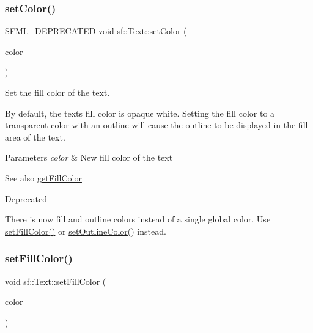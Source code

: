 \subsubsection{\texorpdfstring{setColor()}{setColor()}}
{\footnotesize\ttfamily S\+F\+M\+L\+\_\+\+D\+E\+P\+R\+E\+C\+A\+T\+ED void sf\+::\+Text\+::set\+Color (\begin{DoxyParamCaption}\item[{const \mbox{\hyperlink{classsf_1_1_color}{Color}} \&}]{color }\end{DoxyParamCaption})}



Set the fill color of the text. 

By default, the text\textquotesingle{}s fill color is opaque white. Setting the fill color to a transparent color with an outline will cause the outline to be displayed in the fill area of the text.


\begin{DoxyParams}{Parameters}
{\em color} & New fill color of the text\\
\hline
\end{DoxyParams}
\begin{DoxySeeAlso}{See also}
\mbox{\hyperlink{classsf_1_1_text_a6b4ba8c435b59e1e05f831e6230dc537}{get\+Fill\+Color}}
\end{DoxySeeAlso}
\begin{DoxyRefDesc}{Deprecated}
\item[\mbox{\hyperlink{deprecated__deprecated000016}{Deprecated}}]There is now fill and outline colors instead of a single global color. Use \mbox{\hyperlink{classsf_1_1_text_ab7bb3babac5a6da1802b2c3e1a3e6dcc}{set\+Fill\+Color()}} or \mbox{\hyperlink{classsf_1_1_text_aa19ec69c3b894e963602a6804ca68fe4}{set\+Outline\+Color()}} instead. \end{DoxyRefDesc}
\begin{DoxyVerb}\end{DoxyVerb}
 \mbox{\label{classsf_1_1_text_ab7bb3babac5a6da1802b2c3e1a3e6dcc}} 
\subsubsection{\texorpdfstring{setFillColor()}{setFillColor()}}
{\footnotesize\ttfamily void sf\+::\+Text\+::set\+Fill\+Color (\begin{DoxyParamCaption}\item[{const \mbox{\hyperlink{classsf_1_1_color}{Color}} \&}]{color }\end{DoxyParamCaption})}



